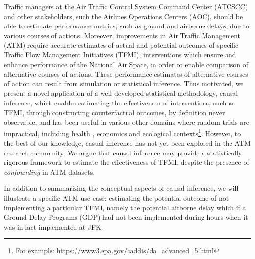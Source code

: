 \documentclass[conference]{IEEEtran}
\begin{document}

Traffic managers at the Air Traffic Control System Command Center (ATCSCC) and other stakeholders, such the Airlines Operations Centers (AOC), should be able to estimate performance metrics, such as ground and airborne delays, due to various courses of actions. Moreover, improvements in Air Traffic Management (ATM) require accurate estimates of actual and potential outcomes of specific Traffic Flow Management Initiatives (TFMI), interventions which ensure and enhance performance of the National Air Space, in order to enable comparison of  alternative courses of actions.  These performance estimates of alternative courses of action can result from simulation or statistical inference.  Thus motivated, we present a novel application of a well developed statistical methodology, causal inference, which enables estimating the effectiveness of interventions, such as TFMI, through constructing counterfactual outcomes, by definition never observable, and has been useful in various other domains where random trials are impractical, including health \cite{austin2011tutorial,victora2004evidence}, economics \cite{bottou2013counterfactual,tariq2009detecting} and ecological contexts\footnote{For example: \url{https://www3.epa.gov/caddis/da_advanced_5.html}}.  However, to the best of our knowledge, casual inference has not yet been explored in the ATM research community.  We argue that causal inference may provide a statistically rigorous framework to estimate the effectiveness of TFMI, despite the presence of \emph{confounding} in ATM datasets.  

In addition to summarizing the conceptual aspects of causal inference, we will illustrate a specific ATM use case: estimating the potential outcome of not implementing a particular TFMI, namely the potential airborne delay which if a Ground Delay Programs (GDP) had not been implemented during hours when it was in fact implemented at JFK.  
\end{document}
